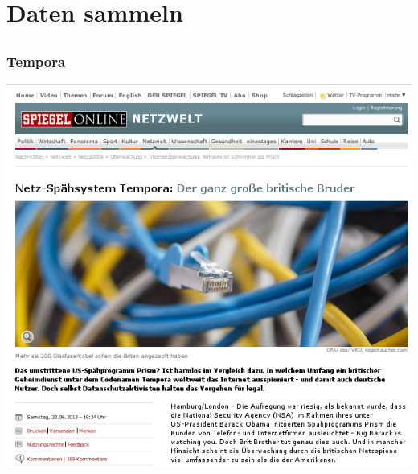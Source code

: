 \documentclass[12pt]{beamer}
\begin{document}
\section{Daten sammeln}
\subsection{}

\begin{frame}
    \frametitle{Tempora}
    \begin{center}
      \includegraphics[height=0.7\textheight]{img/spiegel-tempora.png}
    \end{center}
\end{frame}
\end{document}

